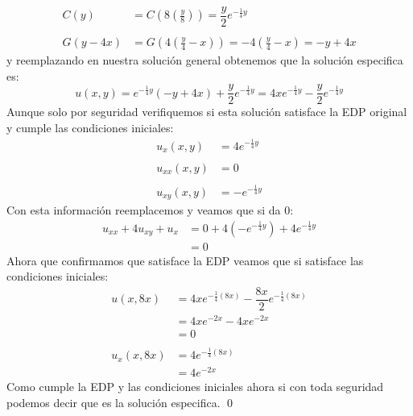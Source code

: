 \begin{homeworkProblem}
\begin{itemize}
\begin{solucion}
\begin{align*}
               C(y)&=C\left(8\left(\frac{y}{8}\right)\right)=\dfrac{y}{2}e^{-\frac{1}{4}y}\\
               \\
               G(y-4x)&=G\left(4\left(\frac{y}{4}-x\right)\right)=-4\left(\frac{y}{4}-x\right)=-y+4x
           \end{align*}
           y reemplazando en nuestra solución general obtenemos que la solución especifica es:
           $$u(x,y)=e^{-\frac{1}{4}y}(-y+4x)+\frac{y}{2}e^{-\frac{1}{4}y}=4xe^{-\frac{1}{4}y}-\dfrac{y}{2}e^{-\frac{1}{4}y}$$
           Aunque solo por seguridad verifiquemos si esta solución satisface la EDP original y cumple las condiciones iniciales:
           \begin{align*}
               u_x(x,y)&=4e^{-\frac{1}{4}y}\\
               \\
               u_{xx}(x,y)&=0\\
               \\
               u_{xy}(x,y)&=-e^{-\frac{1}{4}y}         
           \end{align*}
            Con esta información reemplacemos y veamos que si da $0$:
            \begin{align*}
                u_{xx}+4u_{xy}+u_x&=0+4(-e^{-\frac{1}{4}y})+4e^{-\frac{1}{4}y}\\
                    &=0
            \end{align*}
            Ahora que confirmamos que satisface la EDP veamos que si satisface las condiciones iniciales:
            \begin{align*}
                u(x,8x)&=4xe^{-\frac{1}{4}(8x)}-\dfrac{8x}{2}e^{-\frac{1}{4}(8x)}\\
                        &=4xe^{-2x}-4xe^{-2x}\\
                        &=0\\
                        \\
                u_x(x,8x)&=4e^{-\frac{1}{4}(8x)}\\
                &=4e^{-2x}       
            \end{align*}
           Como cumple la EDP y las condiciones iniciales ahora si con toda seguridad podemos decir que es la solución especifica.
           \qed
        \end{solucion}
    \end{itemize}
\end{homeworkProblem}
\newpage
